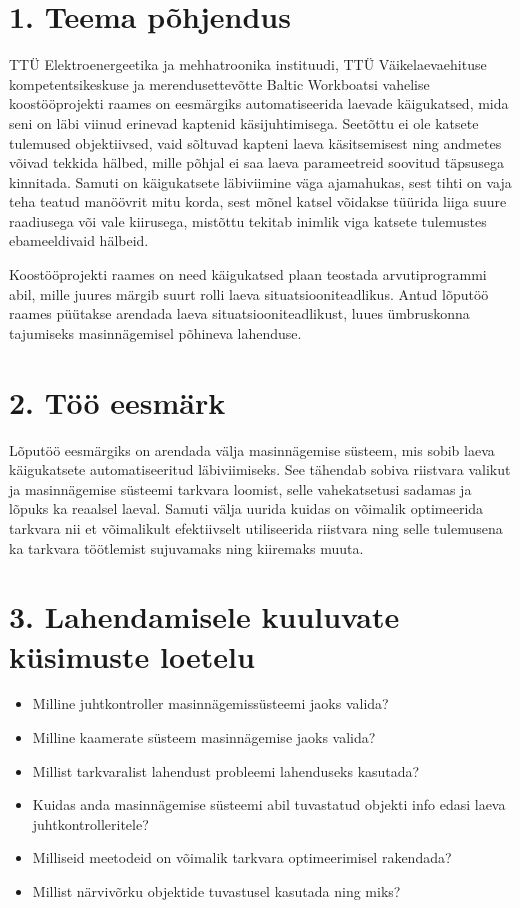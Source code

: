 \section*{1. Teema põhjendus}

TTÜ Elektroenergeetika ja mehhatroonika instituudi, TTÜ Väikelaevaehituse kompetentsikeskuse ja merendusettevõtte Baltic Workboatsi vahelise koostööprojekti raames on eesmärgiks automatiseerida laevade käigukatsed, mida seni on läbi viinud erinevad kaptenid käsijuhtimisega. Seetõttu ei ole katsete tulemused objektiivsed, vaid sõltuvad kapteni laeva käsitsemisest ning andmetes võivad tekkida hälbed, mille põhjal ei saa laeva parameetreid soovitud täpsusega kinnitada. Samuti on käigukatsete läbiviimine väga ajamahukas, sest tihti on vaja teha teatud manöövrit mitu korda, sest mõnel katsel võidakse tüürida liiga suure raadiusega või vale kiirusega, mistõttu tekitab inimlik viga katsete tulemustes ebameeldivaid hälbeid.

Koostööprojekti raames on need käigukatsed plaan teostada arvutiprogrammi abil, mille juures märgib suurt rolli laeva situatsiooniteadlikus. Antud lõputöö raames püütakse arendada laeva situatsiooniteadlikust, luues ümbruskonna tajumiseks masinnägemisel põhineva lahenduse.

\section*{2. Töö eesmärk}

Lõputöö eesmärgiks on arendada välja masinnägemise süsteem, mis sobib laeva käigukatsete automatiseeritud läbiviimiseks. See tähendab sobiva riistvara valikut ja masinnägemise süsteemi tarkvara loomist, selle vahekatsetusi sadamas ja lõpuks ka reaalsel laeval. Samuti välja uurida kuidas on võimalik optimeerida tarkvara nii et võimalikult efektiivselt utiliseerida riistvara ning selle tulemusena ka tarkvara töötlemist sujuvamaks ning kiiremaks muuta.

\section*{3. Lahendamisele kuuluvate küsimuste loetelu}

\begin{itemize}
  \item Milline juhtkontroller masinnägemissüsteemi jaoks valida?
  \item Milline kaamerate süsteem masinnägemise jaoks valida?
  \item Millist tarkvaralist lahendust probleemi lahenduseks kasutada?
  \item Kuidas anda masinnägemise süsteemi abil tuvastatud objekti info edasi laeva juhtkontrolleritele?
  \item Milliseid meetodeid on võimalik tarkvara optimeerimisel rakendada?
  \item Millist närvivõrku objektide tuvastusel kasutada ning miks?
\end{itemize}

